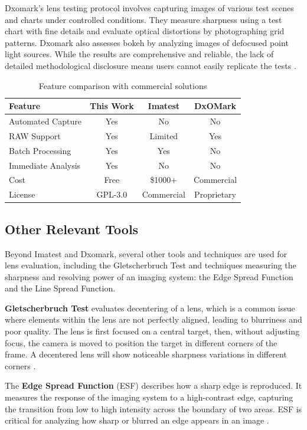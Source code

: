 Dxomark's lens testing protocol involves capturing images of various test scenes and charts under controlled conditions. They measure sharpness using a test chart with fine details and evaluate optical distortions by photographing grid patterns. Dxomark also assesses bokeh by analyzing images of defocused point light sources. While the results are comprehensive and reliable, the lack of detailed methodological disclosure means users cannot easily replicate the tests \cite{DxomarkBokeh}.

\begin{table}[h]
\begin{tabular}{lccc}
\hline
Feature & This Work & Imatest & DxOMark \\
\hline
Automated Capture & Yes & No & No \\
RAW Support & Yes & Limited & Yes \\
Batch Processing & Yes & Yes & No \\
Immediate Analysis & Yes & No & No \\
Cost & Free & \$1000+ & Commercial \\
License & GPL-3.0 & Commercial & Proprietary \\
\hline
\end{tabular}
\caption{Feature comparison with commercial solutions}
\end{table}

\subsection{Other Relevant Tools}
Beyond Imatest and Dxomark, several other tools and techniques are used for lens evaluation, including the Gletscherbruch Test and techniques measuring the sharpness and resolving power of an imaging system: the Edge Spread Function and the Line Spread Function.

\textbf{Gletscherbruch Test} evaluates decentering of a lens, which is a common issue where elements within the lens are not perfectly aligned, leading to blurriness and poor quality. The lens is first focused on a central target, then, without adjusting focus, the camera is moved to position the target in different corners of the frame. A decentered lens will show noticeable sharpness variations in different corners \cite{Gletscherbruch}.

The \textbf{Edge Spread Function} (ESF) describes how a sharp edge is reproduced. It measures the response of the imaging system to a high-contrast edge, capturing the transition from low to high intensity across the boundary of two areas. ESF is critical for analyzing how sharp or blurred an edge appears in an image \cite{ESF}.

